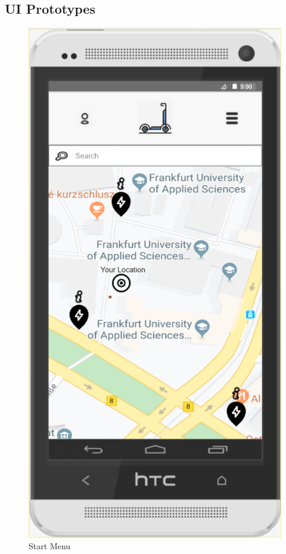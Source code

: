 \documentclass[a4paper, 12pt]{article}
\begin{document}
\subsection{UI Prototypes}
\begin{figure} [htbp]
  \begin{center}
    \includegraphics[scale=0.75]{images/prototypes/01-start-menu.png}
  \end{center}
  \caption{Start Menu}
\end{figure}
\end{document}
